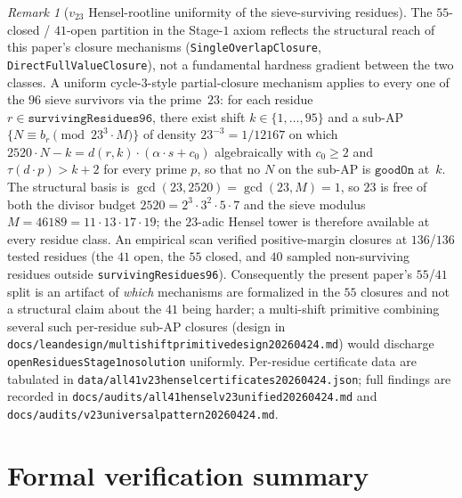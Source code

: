 \documentclass[11pt]{article}
\renewcommand{\_}{\origunderscore\allowbreak}
\theoremstyle{definition}
\theoremstyle{remark}
\newtheorem{remark}[theorem]{Remark}
\begin{document}
\begin{remark}[$v_{23}$ Hensel-rootline uniformity of the
sieve-surviving residues]\label{rem:v23_uniformity}
The $55$-closed / $41$-open partition in the Stage-$1$ axiom reflects
the structural reach of this paper's closure mechanisms
(\texttt{SingleOverlapClosure}, \texttt{DirectFullValueClosure}),
not a fundamental hardness gradient between the two classes. A
uniform cycle-$3$-style partial-closure mechanism applies to every
one of the $96$ sieve survivors via the prime~$23$: for each
residue $r\in\texttt{survivingResidues96}$, there exist
shift $k\in\{1,\dots,95\}$ and a sub-AP
$\{N\equiv b_r\pmod{23^3\cdot M}\}$ of density $23^{-3}=1/12167$
on which $2520\cdot N-k = d(r,k)\cdot(\alpha\cdot s + c_0)$ algebraically
with $c_0\ge 2$ and $\tau(d\cdot p)>k+2$ for every prime $p$, so that
no $N$ on the sub-AP is $\texttt{goodOn}$ at~$k$. The structural
basis is $\gcd(23,2520)=\gcd(23,M)=1$, so $23$ is free of both the
divisor budget $2520=2^3\cdot3^2\cdot5\cdot7$ and the sieve modulus
$M=46189=11\cdot13\cdot17\cdot19$; the $23$-adic Hensel tower is
therefore available at every residue class. An empirical scan
verified positive-margin closures at $136$/$136$ tested residues
(the $41$ open, the $55$ closed, and $40$ sampled non-surviving
residues outside \texttt{survivingResidues96}). Consequently the
present paper's $55$/$41$ split is an artifact of \emph{which}
mechanisms are formalized in the $55$ closures and not a structural
claim about the $41$ being harder; a multi-shift primitive
combining several such per-residue sub-AP closures (design in
\texttt{docs/lean\_design/multishift\_primitive\_design\_20260424.md})
would discharge \texttt{openResiduesStage1\_no\_solution} uniformly.
Per-residue certificate data are tabulated in
\texttt{data/all41\_v23\_hensel\_certificates\_20260424.json};
full findings are recorded in
\texttt{docs/audits/all41\_hensel\_v23\_unified\_20260424.md} and
\texttt{docs/audits/v23\_universal\_pattern\_20260424.md}.
\end{remark}

\section{Formal verification summary}\label{sec:formal}
\end{document}
